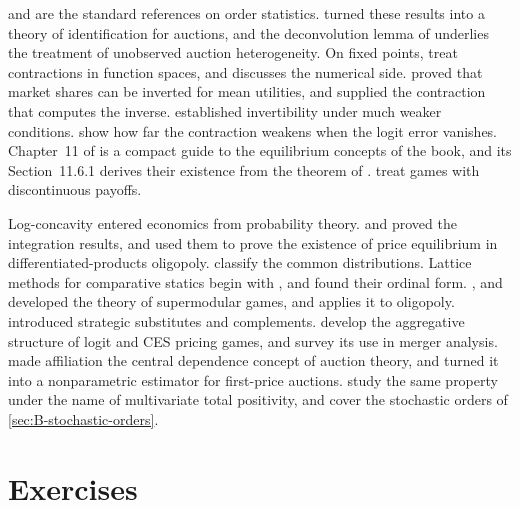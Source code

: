 \citet{David1981} and \citet{ArnoldBalakrishnanNagaraja1992} are the standard references on order statistics.
\citet{AtheyHaile2002, AtheyHaile2007} turned these results into a theory of identification for auctions, and the
deconvolution lemma of \citet{Kotlarski1966} underlies the treatment of unobserved auction heterogeneity. On fixed
points, \citet{StokeyLucas1989} treat contractions in function spaces, and \citet{Judd1998} discusses the numerical
side. \citet{Berry1994} proved that market shares can be inverted for mean utilities, and
\citet{BerryLevinsohnPakes1995} supplied the contraction that computes the inverse. \citet{BerryGandhiHaile2013}
established invertibility under much weaker conditions. \citet{BerryPakes2007} show how far the contraction weakens when the logit error
vanishes. Chapter~11 of \citet{Tirole1988} is a compact guide to the equilibrium concepts of the book, and its
Section~11.6.1 derives their existence from the theorem of \citet{Debreu1952}. \citet{DasguptaMaskin1986} treat
games with discontinuous payoffs.

Log-concavity entered economics from probability theory. \citet{Prekopa1971} and \citet{Borell1975} proved the
integration results, and \citet{CaplinNalebuff1991} used them to prove the existence of price equilibrium in
differentiated-products oligopoly. \citet{BagnoliBergstrom2005} classify the common distributions. Lattice methods
for comparative statics begin with \citet{Topkis1978}, and \citet{MilgromShannon1994} found their ordinal form.
\citet{Topkis1979}, \citet{Vives1990} and \citet{MilgromRoberts1990} developed the theory of supermodular games, and
\citet{Vives1999} applies it to oligopoly. \citet{BulowGeanakoplosKlemperer1985} introduced strategic substitutes
and complements. \citet{NockeSchutz2018} develop the aggregative structure of logit and CES pricing games, and
\citet[p.~229]{AskerNocke2021} survey its use in merger analysis. \citet{MilgromWeber1982} made affiliation the central dependence concept of auction
theory, and \citet{LiPerrigneVuong2002} turned it into a nonparametric estimator for first-price auctions.
\citet{KarlinRinott1980} study the same property under the name of multivariate total positivity, and
\citet{ShakedShanthikumar2007} cover the stochastic orders of \cref{sec:B-stochastic-orders}.

\section{Exercises}\label{sec:B-exercises}

